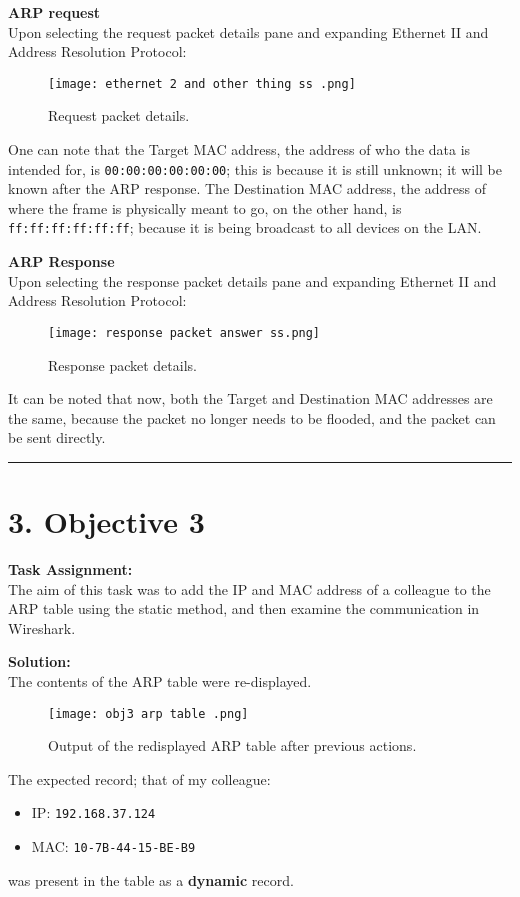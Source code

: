 \documentclass[a4paper,12pt]{article}
\begin{document}
\textbf{ARP request} \\
Upon selecting the request packet details pane and expanding Ethernet II and Address Resolution Protocol:
\begin{figure}[H]
\centering
\texttt{[image: ethernet 2 and other thing ss .png]}
\caption{Request packet details.}
\end{figure}
One can note that the Target MAC address, the address of who the data is intended for, is \texttt{00:00:00:00:00:00}; this is because it is still unknown; it will be known after the ARP response.
The Destination MAC address, the address of where the frame is physically meant to go, on the other hand, is \texttt{ff:ff:ff:ff:ff:ff}; because it is being broadcast to all devices on the LAN.
\vspace{1em}

\textbf{ARP Response} \\
Upon selecting the response packet details pane and expanding Ethernet II and Address Resolution Protocol:
\begin{figure}[H]
\centering
\texttt{[image: response packet answer ss.png]}
\caption{Response packet details.}
\end{figure}

It can be noted that now, both the Target and Destination MAC addresses are the same, because the packet no longer needs to be flooded, and the packet can be sent directly.
\vspace{1em}
\hrule
\section*{3. Objective 3}
\textbf{Task Assignment:} \\
The aim of this task was to add the IP and MAC address of a colleague to the ARP table using the static method, and then examine the communication in Wireshark.

\textbf{Solution:} \\
The contents of the ARP table were re-displayed.
\begin{figure}[H]
\centering
\texttt{[image: obj3 arp table .png]}
\caption{Output of the redisplayed ARP table after previous actions.}
\end{figure}

The expected record; that of my colleague:
\begin{itemize}
    \item IP: \texttt{192.168.37.124}
    \item MAC: \texttt{10-7B-44-15-BE-B9}
\end{itemize}
was present in the table as a \textbf{dynamic} record.
\end{document}
